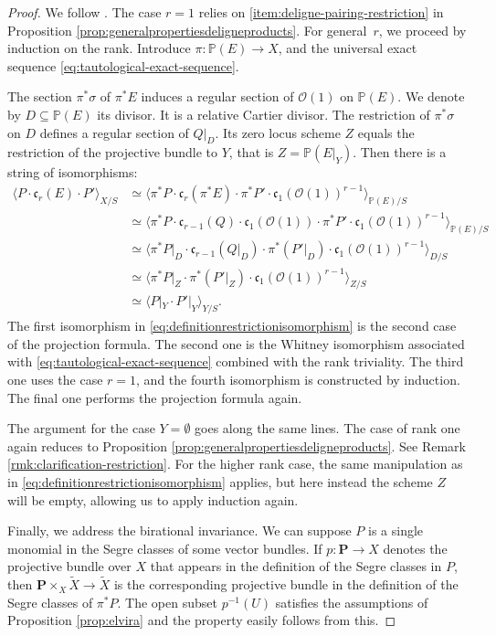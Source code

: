 \documentclass[JEP,XML,SOM,Unicode,published]{cedram}
\theoremstyle{plain}
\theoremstyle{definition}
\newcommand{\PBbb}{\mathbb P}
\newcommand{\Ocal}{\mathcal O}
\newcommand{\cfrak}{\mathfrak c}
\begin{document}
\begin{proof}
We follow \cite[\textsection V.4.10]{Elkikfib}. The case $r=1$ relies on \eqref{item:deligne-pairing-restriction} in Proposition \ref{prop:generalpropertiesdeligneproducts}. For general~$r$, we proceed by induction on the rank. Introduce $\pi\colon\PBbb(E)\to X$, and the universal exact sequence \eqref{eq:tautological-exact-sequence}.

The section $\pi^{\ast}\sigma$ of $\pi^{\ast}E$ induces a regular section of $\Ocal(1)$ on $\PBbb(E)$. We denote by $D\subseteq\PBbb(E)$ its divisor. It is a relative Cartier divisor. The restriction of $\pi^{\ast}\sigma$ on $D$ defines a regular section of $Q|_{D}$. Its zero locus scheme $Z$ equals the restriction of the projective bundle to $Y$, that is $Z=\PBbb(E|_Y)$. Then there is a string of isomorphisms:
\begin{equation}\label{eq:definitionrestrictionisomorphism}
\begin{split}
\langle P \cdot \cfrak_r(E) \cdot P' \rangle_{X/S} & \simeq \langle \pi^\ast P \cdot \cfrak_r(\pi^\ast E) \cdot \pi^\ast P' \cdot \cfrak_{1}(\Ocal(1))^{r-1} \rangle_{\PBbb(E)/S} \\
& \simeq \langle \pi^\ast P \cdot \cfrak_{r-1}(Q)\cdot \cfrak_{1}(\Ocal(1)) \cdot \pi^\ast P' \cdot \cfrak_{1}(\Ocal(1))^{r-1} \rangle_{\PBbb(E)/S} \\
& \simeq \langle \pi^{\ast}P|_{D} \cdot \cfrak_{r-1}(Q|_D) \cdot \pi^\ast (P'|_D )\cdot \cfrak_{1}(\Ocal(1))^{r-1} \rangle_{D/S} \\
& \simeq \langle \pi^{\ast}P|_{Z} \cdot \pi^\ast (P'|_Z )\cdot \cfrak_{1}(\Ocal(1))^{r-1} \rangle_{Z/S} \\
& \simeq \langle P|_{Y} \cdot P'|_Y \rangle_{Y/S}.
\end{split}
\end{equation}
The first isomorphism in \eqref{eq:definitionrestrictionisomorphism} is the second case of the projection formula. The second one is the Whitney isomorphism associated with \eqref{eq:tautological-exact-sequence} combined with the rank triviality. The third one uses the case $r=1$, and the fourth isomorphism is constructed by induction. The final one performs the projection formula again.

The argument for the case $Y=\emptyset$ goes along the same lines. The case of rank one again reduces to Proposition \ref{prop:generalpropertiesdeligneproducts}. See Remark \ref{rmk:clarification-restriction}. For the higher rank case, the same manipulation as in \eqref{eq:definitionrestrictionisomorphism} applies, but here instead the scheme $Z$ will be empty, allowing us to apply induction again.

Finally, we address the birational invariance. We can suppose $P$ is a single monomial in the Segre classes of some vector bundles. If $p: \mathbf{P} \to X$ denotes the projective bundle over $X$ that appears in the definition of the Segre classes in $P$, then $\mathbf{P} \times_X \widetilde{X} \to \widetilde{X}$ is the corresponding projective bundle in the definition of the Segre classes of $\pi^\ast P$. The open subset $p^{-1}(U)$ satisfies the assumptions of Proposition \ref{prop:elvira} and the property easily follows from this.
\end{proof}
\end{document}
